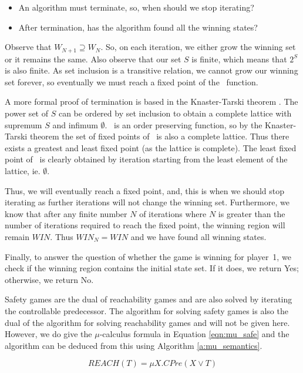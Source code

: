 \begin{itemize}
    \item An algorithm must terminate, so, when should we stop iterating?
    \item After termination, has the algorithm found all the winning states?
\end{itemize}

Observe that $W_{N+1} \supseteq W_N$. So, on each iteration, we either grow the winning set or it remains the same. Also observe that our set $S$ is finite, which means that $2^S$ is also finite. As set inclusion is a transitive relation, we cannot grow our winning set forever, so eventually we must reach a fixed point of the \cpre\ function. 

A more formal proof of termination is based in the Knaster-Tarski theorem \cite{knaster_tarski}. The power set of $S$ can be ordered by set inclusion to obtain a complete lattice with supremum $S$ and infimum $\emptyset$. \cpre\ is an order preserving function, so by the Knaster-Tarski theorem the set of fixed points of \cpre\ is also a complete lattice. Thus there exists a greatest and least fixed point (as the lattice is complete). The least fixed point of \cpre\ is clearly obtained by iteration starting from the least element of the lattice, ie. $\emptyset$. 

Thus, we will eventually reach a fixed point, and, this is when we should stop iterating as further iterations will not change the winning set. Furthermore, we know that after any finite number $N$ of iterations where $N$ is greater than the number of iterations required to reach the fixed point, the winning region will remain $WIN$. Thus $WIN_N = WIN$ and we have found all winning states.

Finally, to answer the question of whether the game is winning for player~1, we check if the winning region contains the initial state set. If it does, we return Yes; otherwise, we return No.

Safety games are the dual of reachability games and are also solved by iterating the controllable predecessor. The algorithm for solving safety games is also the dual of the algorithm for solving reachability games and will not be given here. However, we do give the $\mu$-calculus formula in Equation \ref{eqn:mu_safe} and the algorithm can be deduced from this using Algorithm \ref{a:mu_semantics}.

\begin{equation}
    \mathit{REACH}(T) = \mu X. CPre(X \vee T)
\label{eqn:mu_reach}
\end{equation}

